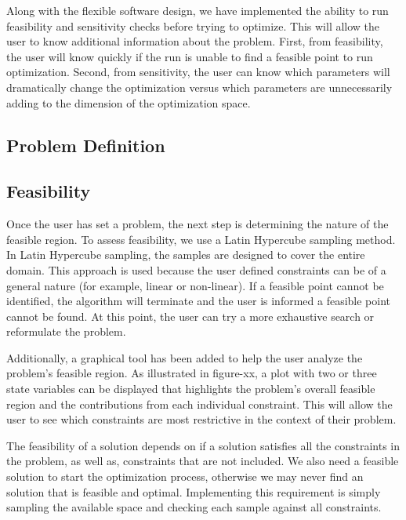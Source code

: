 \documentclass[10pt]{article}
\begin{document}
Along with the flexible software design, we have implemented the ability to run feasibility and sensitivity checks before trying to optimize. This will allow the user to know additional information about the problem. First, from feasibility, the user will know quickly if the run is unable to find a feasible point to run optimization. Second, from sensitivity, the user can know which parameters will dramatically change the optimization versus which parameters are unnecessarily adding to the dimension of the optimization space. 

\subsection{Problem Definition}
\label{sec:Problem_Definition}


\subsection{Feasibility}
\label{subsec:Feasibility}

Once the user has set a problem, the next step is determining the nature of the feasible region.  To assess feasibility, we use a Latin Hypercube sampling method.  In Latin Hypercube sampling, the samples are designed to cover the entire domain.  This approach is used because the user defined constraints can be of a general nature (for example, linear or non-linear).  If a feasible point cannot be identified, the algorithm will terminate and the user is informed a feasible point cannot be found.  At this point, the user can try a more exhaustive search or reformulate the problem.

Additionally, a graphical tool has been added to help the user analyze the problem's feasible region.  As illustrated in figure-xx, a plot with two or three state variables can be displayed that highlights the problem's overall feasible region and the contributions from each individual constraint.  This will allow the user to see which constraints are most restrictive in the context of their problem.


The feasibility of a solution depends on if a solution satisfies all the constraints in the problem, as well as, constraints that are not included. We also need a feasible solution to start the optimization process, otherwise we may never find an solution that is feasible and optimal. Implementing this requirement is simply sampling the available space and checking each sample against all constraints. 
\end{document}
